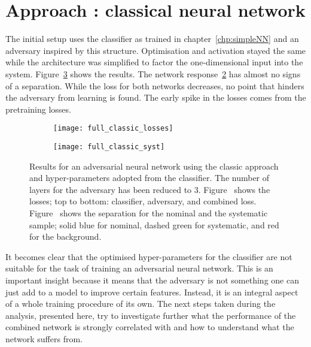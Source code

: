 


\section{Approach : classical neural network}

The initial setup uses the classifier as trained in chapter~\ref{chp:simpleNN} and an adversary inspired by this structure. Optimisation and activation stayed the same while the architecture was simplified to factor the one-dimensional input into the system. Figure~\ref{fig:app1:classic} shows the results. The network response~\ref{fig:app1:classic:syst} has almost no signs of a separation. While the loss for both networks decreases, no point that hinders the adversary from learning is found. The early spike in the losses comes from the pretraining losses.

\begin{figure}[htbp]
    \centering
    \begin{subfigure}[b]{0.45\textwidth}
        \texttt{[image: full\_classic\_losses]}
        \caption{}
        \label{fig:app1:classic:losses}
    \end{subfigure}
\quad
    \begin{subfigure}[b]{0.45\textwidth}
        \texttt{[image: full\_classic\_syst]}
        \caption{}
        \label{fig:app1:classic:syst}
    \end{subfigure}
    \caption{Results for an adversarial neural network using the classic approach and hyper-parameters adopted from the classifier. The number of layers for the adversary has been reduced to \num{3}. Figure~ shows the losses; top to bottom: classifier, adversary, and combined loss. Figure~ shows the separation for the nominal and the systematic sample; solid blue for nominal, dashed green for systematic, and red for the background.}
	\label{fig:app1:classic}
\end{figure}

It becomes clear that the optimised hyper-parameters for the classifier are not suitable for the task of training an adversarial neural network. This is an important insight because it means that the adversary is not something one can just add to a model to improve certain features. Instead, it is an integral aspect of a whole training procedure of its own. The next steps taken during the analysis, presented here, try to investigate further what the performance of the combined network is strongly correlated with and how to understand what the network suffers from.

